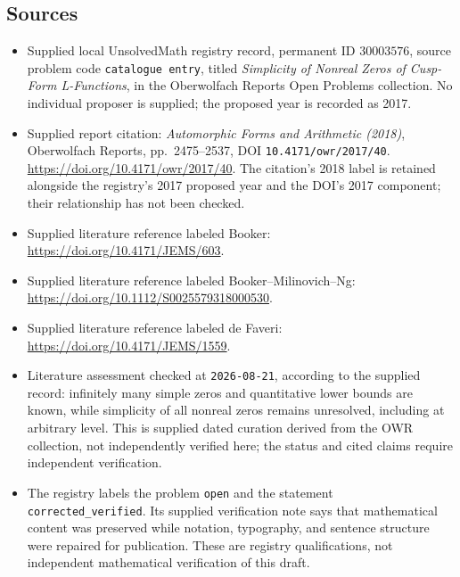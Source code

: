 \documentclass[11pt]{article}
\begin{document}
\subsection{Sources}
\begin{itemize}
\item Supplied local UnsolvedMath registry record, permanent ID \(30003576\), source problem code \texttt{catalogue entry}, titled \emph{Simplicity of Nonreal Zeros of Cusp-Form L-Functions}, in the Oberwolfach Reports Open Problems collection. No individual proposer is supplied; the proposed year is recorded as 2017.
\item Supplied report citation: \emph{Automorphic Forms and Arithmetic (2018)}, Oberwolfach Reports, pp.~2475--2537, DOI \texttt{10.4171/owr/2017/40}. \url{https://doi.org/10.4171/owr/2017/40}. The citation's 2018 label is retained alongside the registry's 2017 proposed year and the DOI's 2017 component; their relationship has not been checked.
\item Supplied literature reference labeled Booker: \url{https://doi.org/10.4171/JEMS/603}.
\item Supplied literature reference labeled Booker--Milinovich--Ng: \url{https://doi.org/10.1112/S0025579318000530}.
\item Supplied literature reference labeled de Faveri: \url{https://doi.org/10.4171/JEMS/1559}.
\item Literature assessment checked at \texttt{2026-08-21}, according to the supplied record: infinitely many simple zeros and quantitative lower bounds are known, while simplicity of all nonreal zeros remains unresolved, including at arbitrary level. This is supplied dated curation derived from the OWR collection, not independently verified here; the status and cited claims require independent verification.
\item The registry labels the problem \texttt{open} and the statement \texttt{corrected\_verified}. Its supplied verification note says that mathematical content was preserved while notation, typography, and sentence structure were repaired for publication. These are registry qualifications, not independent mathematical verification of this draft.
\end{itemize}
\end{document}
